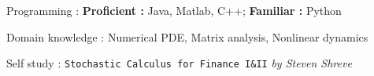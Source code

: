 


\begin{cvskills}


\cvskill
	{Programming : } 
	{\textbf{Proficient :}  Java, Matlab, C++; 
	\textbf{Familiar :} Python} 

\cvskill
	{Domain knowledge : }
	{Numerical PDE, Matrix analysis, Nonlinear dynamics}

\cvskill
	{Self study : }
	{\texttt{Stochastic Calculus for Finance I\&II} \textit{by Steven Shreve}}



\end{cvskills}
